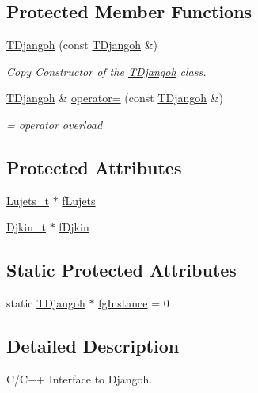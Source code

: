 \subsection*{Protected Member Functions}
\begin{DoxyCompactItemize}
\item 
\hyperlink{class_t_djangoh_a7b47ea508e2047b99b6f3efd6ba37278}{T\+Djangoh} (const \hyperlink{class_t_djangoh}{T\+Djangoh} \&)
\begin{DoxyCompactList}\small\item\em Copy Constructor of the \hyperlink{class_t_djangoh}{T\+Djangoh} class. \end{DoxyCompactList}\item 
\hyperlink{class_t_djangoh}{T\+Djangoh} \& \hyperlink{class_t_djangoh_a987204dc283979db28c83e5a35177b7c}{operator=} (const \hyperlink{class_t_djangoh}{T\+Djangoh} \&)
\begin{DoxyCompactList}\small\item\em = operator overload \end{DoxyCompactList}\end{DoxyCompactItemize}
\subsection*{Protected Attributes}
\begin{DoxyCompactItemize}
\item 
\hyperlink{struct_lujets__t}{Lujets\+\_\+t} $\ast$ \hyperlink{class_t_djangoh_a844cd27abcd743028fb98b3fba0c0fa9}{f\+Lujets}
\item 
\hyperlink{struct_djkin__t}{Djkin\+\_\+t} $\ast$ \hyperlink{class_t_djangoh_a870f9e5b91afdae5f21c10daae7c5d7e}{f\+Djkin}
\end{DoxyCompactItemize}
\subsection*{Static Protected Attributes}
\begin{DoxyCompactItemize}
\item 
static \hyperlink{class_t_djangoh}{T\+Djangoh} $\ast$ \hyperlink{class_t_djangoh_ad154e9fce28f84ab490dc6508db58fb8}{fg\+Instance} = 0
\end{DoxyCompactItemize}


\subsection{Detailed Description}
C/\+C++ Interface to Djangoh. 

